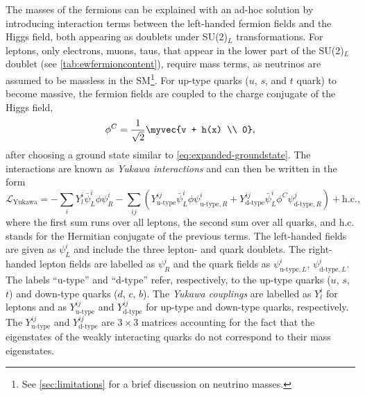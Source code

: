 The masses of the fermions can be explained with an ad-hoc solution by introducing interaction terms between the left-handed fermion fields and the Higgs field, both appearing as doublets under SU(2)$_L$ transformations.
For leptons, only electrons, muons, taus, that appear in the lower part of the SU(2)$_L$ doublet (see \cref{tab:ewfermioncontent}), require mass terms, as neutrinos are assumed to be massless in the SM\footnote{See \cref{sec:limitations} for a brief discussion on neutrino masses.}.
For up-type quarks ($u$, $s$, and $t$ quark) to become massive, the fermion fields are coupled to the charge conjugate of the Higgs field,
\begin{equation}
  \phi^C = \frac{1}{\sqrt{2}} \myvec{v + h(x) \\ 0},
\end{equation}
after choosing a ground state similar to \cref{eq:expanded-groundstate}.
The interactions are known as \emph{Yukawa interactions} and can then be written in the form
\begin{equation}
  \mathcal{L}_\text{Yukawa} = - \sum_{i} Y_l^i \bar{\psi}^{i}_{L} \phi \psi^{i}_{R} - \sum_{ij} \left( Y_{\text{u-type}}^{ij} \bar{\psi}^{i}_{L} \phi \psi^{i}_{\text{u-type},R} + Y_{\text{d-type}}^{ij} \bar{\psi}^{i}_{L} \phi^C \psi^{j}_{\text{d-type}, R} \right) + \text{h.c.}, 
  \label{eq:lyukawa}
\end{equation}
where the first sum runs over all leptons, the second sum over all quarks, and h.c. stands for the Hermitian conjugate of the previous terms.
The left-handed fields are given as $\psi^{i}_{L}$ and include the three lepton- and quark doublets. 
The right-handed lepton fields are labelled as $\psi_R^i$ and the quark fields as $\psi^{i}_{\text{u-type},L}$, $\psi^{i}_{\text{d-type},L}$.
The labels ``u-type'' and ``d-type'' refer, respectively, to the up-type quarks ($u$, $s$, $t$) and down-type quarks ($d$, $c$, $b$). 
The \emph{Yukawa couplings} are labelled as $Y_l^i$ for leptons and as $Y_{\text{u-type}}^{ij}$ and $Y_{\text{d-type}}^{ij}$ for up-type and down-type quarks, respectively. The $Y_{\text{u-type}}^{ij}$ and $Y_{\text{d-type}}^{ij}$ are $3 \times 3$ matrices accounting for the fact that the eigenstates of the weakly interacting quarks do not correspond to their mass eigenstates. 
